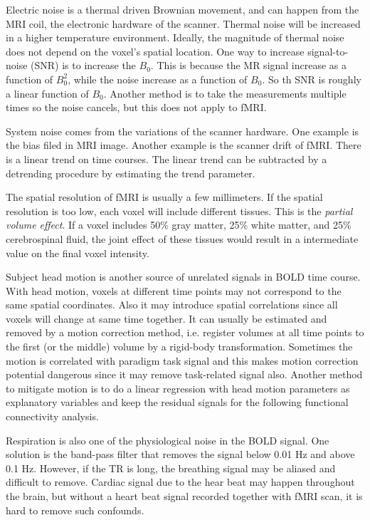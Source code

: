 \documentclass[12pt]{article}
\begin{document}
Electric noise is a thermal driven Brownian movement, and can happen from the
MRI coil, the electronic hardware of the scanner. Thermal noise will be
increased in a higher temperature environment. Ideally, the magnitude of thermal
noise does not depend on the voxel's spatial location. One way to increase
signal-to-noise (SNR) is to increase the $B_0$. This is because the MR signal
increase as a function of $B_0^2$, while the noise increase as a function of
$B_0$. So th SNR is roughly a linear function of $B_0$.  Another method is to
take the measurements multiple times so the noise cancels, but this does not
apply to fMRI.

System noise comes from the variations of the scanner hardware. One example is
the bias filed in MRI image. Another example is the scanner drift of fMRI. There
is a linear trend on time courses. The linear trend can be subtracted by a
detrending procedure by estimating the trend parameter.

The spatial resolution of fMRI is usually a few millimeters. If the spatial
resolution is too low, each voxel will include different tissues. This is the
\emph{partial volume effect}. If a voxel includes 50\% gray matter, 25\% white
matter, and 25\% cerebrospinal fluid, the joint effect of these tissues would
result in a intermediate value on the final voxel intensity. 

Subject head motion is another source of unrelated signals in BOLD time
course. With head motion, voxels at different time points may not correspond to
the same spatial coordinates. Also it may introduce spatial correlations since
all voxels will change at same time together. It can usually be estimated and
removed by a motion correction method, i.e. register volumes at all time points
to the first (or the middle) volume by a rigid-body transformation. Sometimes
the motion is correlated with paradigm task signal and this makes motion
correction potential dangerous since it may remove task-related signal
also. Another method to mitigate motion is to do a linear regression with head
motion parameters as explanatory variables and keep the residual signals for the
following functional connectivity analysis.

Respiration is also one of the physiological noise in the BOLD signal. One
solution is the band-pass filter that removes the signal below 0.01 Hz and above
0.1 Hz. However, if the TR is long, the breathing signal may be aliased and
difficult to remove. Cardiac signal due to the hear beat may happen throughout
the brain, but without a heart beat signal recorded together with fMRI scan, it
is hard to remove such confounds.
\end{document}
